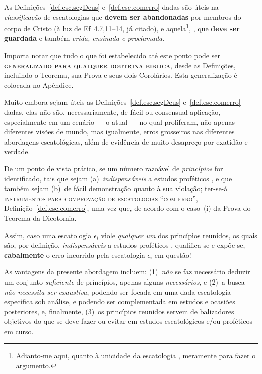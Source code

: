     As Definições~\ref{def.esc.segDeus} e~\ref{def.esc.comerro} dadas são úteis  na  \emph{classificação}  de  escatologias  que
    \textbf{devem  ser  abandonadas}  por  membros  do  corpo   de   Cristo   (à   luz   de   Ef~4.7,11--14,   já   citado),   e
    aquela\footnote{Adianto-me  aqui,  quanto  à  unicidade  da  escatologia  ,  meramente  para  fazer  o
    argumento.}, , que \textbf{deve ser guardada} e também \emph{crida, ensinada e proclamada}.

    Importa notar que tudo o que foi estabelecido até este ponto pode ser \textbf{\textsc{generalizado  para  qualquer  doutrina
    bíblica}}, desde as Definições, incluindo o Teorema, sua Prova e seus dois Corolários.  Esta  generalização  é  colocada  no
    Apêndice.

    Muito embora sejam úteis as Definições~\ref{def.esc.segDeus} e~\ref{def.esc.comerro} dadas, elas não  são,  necessariamente,
    de fácil ou consensual aplicação, especialmente em um cenário --- o atual --- no  qual  proliferam,  não  apenas  diferentes
    visões de mundo, mas igualmente, erros grosseiros nas diferentes  abordagens  escatológicas,  além  de  evidência  de  muito
    desapreço por exatidão e verdade.

    De  um  ponto  de  vista  prático,  se  um  número  razoável  de  \emph{princípios}  for  identificado,   tais   que   sejam
    (a)~\emph{indispensáveis} a estudos proféticos , e que também sejam (b)~de fácil demonstração quanto  à
    sua violação; ter-se-á \textsc{instrumentos para comprovação de escatologias ``com erro''}, Definição~\ref{def.esc.comerro},
    uma vez que, de acordo com o caso~(i) da Prova do Teorema da Dicotomia.

    Assim, caso uma escatologia $\epsilon_i$ viole \emph{qualquer um} dos princípios reunidos,  os  quais  são,  por  definição,
    \emph{indispensáveis} a estudos proféticos ,  qualifica-se  e  expõe-se,  \textbf{cabalmente}  o  erro
    incorrido pela escatologia $\epsilon_i$ em questão!

    As vantagens da presente abordagem incluem: (1)~\emph{não} se  faz  necessário  deduzir  um  conjunto  \emph{suficiente}  de
    princípios, apenas alguns \emph{necessários}, e (2)~a busca \emph{não necessita ser exaustiva}, podendo ser  focada  em  uma
    dada escatologia específica sob análise, e podendo ser complementada em  estudos  e  ocasiões  posteriores,  e,  finalmente,
    (3)~os princípios reunidos servem de balizadores objetivos do que se deve fazer ou  evitar  em  estudos  escatológicos  e/ou
    proféticos em curso.


